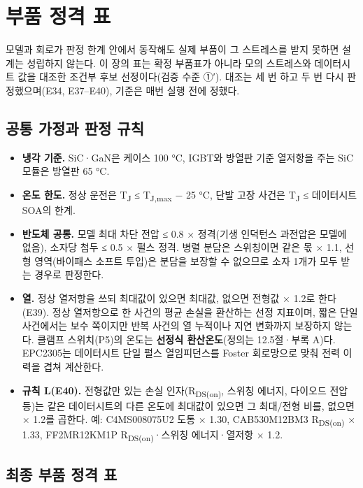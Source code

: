 \chapter{부품 정격 표}

모델과 회로가 판정 한계 안에서 동작해도 실제 부품이 그 스트레스를 받지 못하면 설계는 성립하지 않는다. 이 장의 표는 확정 부품표가 아니라 모의 스트레스와 데이터시트 값을 대조한 조건부 후보 선정이다(검증 수준 ①′). 대조는 세 번 하고 두 번 다시 판정했으며(E34, E37–E40), 기준은 매번 실행 전에 정했다.

\section{공통 가정과 판정 규칙}

\begin{itemize}
\item \textbf{냉각 기준.} SiC·GaN은 케이스 100 °C, IGBT와 방열판 기준 열저항을 주는 SiC 모듈은 방열판 65 °C.
\item \textbf{온도 한도.} 정상 운전은 T\textsubscript{J} ≤ T\textsubscript{J,max} − 25 °C, 단발 고장 사건은 T\textsubscript{J} ≤ 데이터시트 SOA의 한계.
\item \textbf{반도체 공통.} 모델 최대 차단 전압 ≤ 0.8 × 정격(기생 인덕턴스 과전압은 모델에 없음), 소자당 첨두 ≤ 0.5 × 펄스 정격. 병렬 분담은 스위칭이면 같은 몫 × 1.1, 선형 영역(바이패스 소프트 투입)은 분담을 보장할 수 없으므로 소자 1개가 모두 받는 경우로 판정한다.
\item \textbf{열.} 정상 열저항을 쓰되 최대값이 있으면 최대값, 없으면 전형값 × 1.2로 한다(E39). 정상 열저항으로 한 사건의 평균 손실을 환산하는 선정 지표이며, 짧은 단일 사건에서는 보수 쪽이지만 반복 사건의 열 누적이나 지연 변화까지 보장하지 않는다. 클램프 스위치(P5)의 온도는 \textbf{선정식 환산온도}(정의는 12.5절·부록 A)다. EPC2305는 데이터시트 단일 펄스 열임피던스를 Foster 회로망으로 맞춰 전력 이력을 겹쳐 계산한다.
\item \textbf{규칙 L(E40).} 전형값만 있는 손실 인자(R\textsubscript{DS(on)}, 스위칭 에너지, 다이오드 전압 등)는 같은 데이터시트의 다른 온도에 최대값이 있으면 그 최대/전형 비를, 없으면 × 1.2를 곱한다. 예: C4MS008075U2 도통 × 1.30, CAB530M12BM3 R\textsubscript{DS(on)} × 1.33, FF2MR12KM1P R\textsubscript{DS(on)}·스위칭 에너지·열저항 × 1.2.
\end{itemize}

\section{최종 부품 정격 표}

